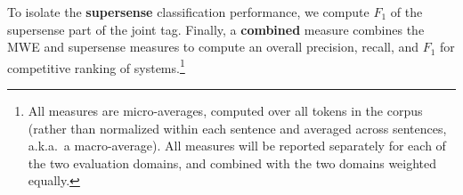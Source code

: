 \documentclass[11pt]{article}
\newcommand{\ensuretext}[1]{#1}
\newcommand{\nssmarker}{\ensuretext{\textcolor{magenta}{\ensuremath{^{\textsc{NS}}_{\textsc{S}}}}}}
\newcommand{\arkcomment}[3]{\ensuretext{\textcolor{#3}{[#1 #2]}}}
\newcommand{\nss}[1]{\arkcomment{\nssmarker}{#1}{magenta}}
\newcommand{\longversion}[1]{} %
\begin{document}
To isolate the \textbf{supersense} classification performance, 
we compute $F_1$ of the supersense part of the joint tag.\longversion{
Because the supersense of a strong MWE is marked on its first word, 
this will have the effect of penalizing errors on the left boundary of an MWE, 
but it is less sensitive to the MWE analysis than the link-based measure. 

The third measure is a hybrid of the first two: it computes \textbf{overall} performance 
in terms of link-based $F_1$, where for each supersense label, 
a self-link encoding that label is added to the first word of the expression.
Credit is only given for a self-link if in the other analysis, 
a corresponding self-link occurs with the same supersense.\nss{short:}}
Finally, a \textbf{combined} measure combines the MWE and supersense measures 
to compute an overall precision, recall, and $F_1$
for competitive ranking of systems.\footnote{All measures are micro-averages, 
computed over all tokens in the corpus 
(rather than normalized within each sentence and averaged across sentences, a.k.a.~a macro-average).
All measures will be reported separately for each of the two evaluation domains, 
and combined with the two domains weighted equally.}


\end{document}
